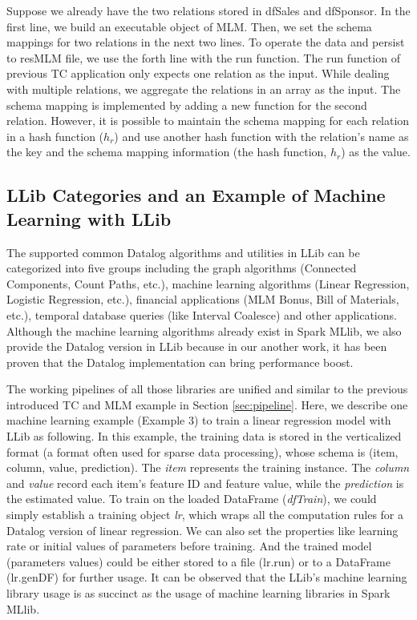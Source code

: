 \eldl
Suppose we already have the two relations stored in dfSales and dfSponsor. In the first line, we build an executable object of MLM. Then, we set the schema mappings for two relations in the next two lines. To operate the data and persist to resMLM file, we use the forth line with the run function.  The run function of previous TC application only expects one relation as the input. While dealing with multiple relations, we aggregate the relations in an array as the input. The schema mapping is implemented by adding a new function for the second relation. However, it is possible to  maintain the schema mapping for each relation in a hash function ($h_r$) and use another hash function with the relation's name as the key and the schema mapping information (the hash function, $h_r$) as the value. 

\subsection{LLib Categories and an Example of Machine Learning with LLib}
The supported common Datalog algorithms and utilities in LLib can be  categorized into five groups including the graph algorithms (Connected Components, Count Paths, etc.), machine learning algorithms (Linear Regression, Logistic Regression, etc.), financial applications (MLM Bonus, Bill of Materials, etc.), temporal database queries (like Interval Coalesce) and other applications. Although the machine learning algorithms already exist in Spark MLlib, we also provide the Datalog version in LLib because in our another work, it has been proven that the Datalog implementation can bring performance boost. 

The working pipelines of all those libraries are unified and similar to the previous introduced TC and MLM example in Section \ref{sec:pipeline}. Here, we describe one machine learning example (Example 3) to train a linear regression model with LLib as following.
In this example, the training data is stored in the verticalized format (a format often used for sparse data processing), whose schema is (item, column, value, prediction). The \textit{item} represents the training instance. The \textit{column} and \textit{value} record each item's feature ID and feature value, while the \textit{prediction} is the estimated value. To train on the loaded DataFrame (\textit{dfTrain}), we could simply establish a training object \textit{lr}, which wraps all the computation rules for a Datalog version of linear regression. We can also set the properties like learning rate or initial values of parameters before training. And the trained model (parameters values) could be either stored to a file (lr.run) or to a DataFrame (lr.genDF) for further usage. It can be observed that the LLib's machine learning library usage is as succinct as the usage of machine learning libraries in Spark MLlib.

